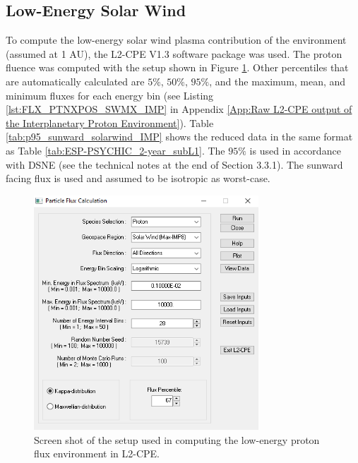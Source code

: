 \documentclass{hitec}
\begin{document}
\subsection{Low-Energy Solar Wind}
\label{ssec:natenv-Low-Energy Solar Wind}

To compute the low-energy solar wind plasma contribution of the environment (assumed at 1 AU), the L2-CPE V1.3 software package was used. The proton fluence was computed with the setup shown in Figure \ref{fig:L2-CPE-Setup}. Other percentiles that are automatically calculated are $5\%$, $50\%$, $95\%$, and the maximum, mean, and minimum fluxes for each energy bin (see Listing \ref{lst:FLX_PTNXPOS_SWMX_IMP} in Appendix \ref{App:Raw L2-CPE output of the Interplanetary Proton Environment}). Table \ref{tab:p95_sunward_solarwind_IMP} shows the reduced data in the same format as Table \ref{tab:ESP-PSYCHIC_2-year_subL1}. The $95\%$ is used in accordance with DSNE (see the technical notes at the end of Section 3.3.1). The sunward facing flux is used and assumed to be isotropic as worst-case. 

\begin{figure}[htbp!]
	\centering
	\includegraphics[width=0.75\textwidth]{../L2CPE/L2-CPE-Setup.PNG}
	\caption{Screen shot of the setup used in computing the low-energy proton flux environment in L2-CPE.}\label{fig:L2-CPE-Setup}
\end{figure}
\end{document}
